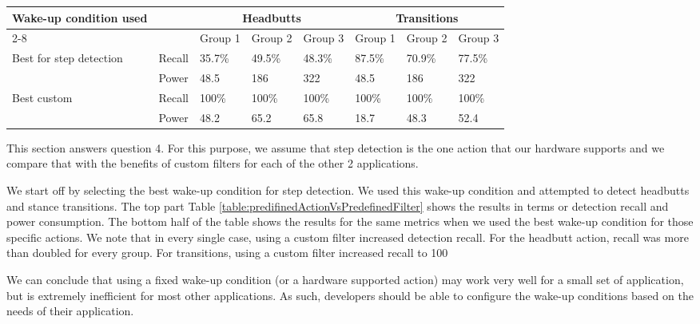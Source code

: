 \begin{table*}[t]
    \begin{tabular}{|l|l|l|l|l|l|l|l|}
    \hline
    \multirow{2}{*}{ Wake-up condition used}
							& \multirow{2}{*}{~} & \multicolumn{3}{c|}{Headbutts} & \multicolumn{3}{c|}{Transitions} \\ \cline{2-8}
							&       & Group 1 & Group 2   & Group 3 & Group 1 & Group 2     & Group 3 \\ \hline
    \multirow{2}{*}{Best for step detection}
							& Recall & 35.7\%  & 49.5\%    & 48.3\%  & 87.5\%  & 70.9\%      & 77.5\%  \\ \cline{2-8}
							& Power  & 48.5    & 186       & 322     & 48.5    & 186         & 322     \\ \hline
    \multirow{2}{*}{Best custom}
							& Recall & 100\%   & 100\%     & 100\%   & 100\%   & 100\%       & 100\%   \\ \cline{2-8}
							& Power  & 48.2    & 65.2      & 65.8    & 18.7    & 48.3        & 52.4    \\ \hline
    \end{tabular}
	\caption{Detection recall and power consumption for the Headbutts and Transitions action using fixed or custom wake-up conditions}
	\label{table:predifinedActionVsPredefinedFilter}
\end{table*}

This section answers question 4. For this purpose, we assume that step detection is the one action that our hardware supports and we compare that with the benefits of custom filters for each of the other 2 applications. 

We start off by selecting the best wake-up condition for step detection. We used this wake-up condition and attempted to detect headbutts and stance transitions. The top part Table \ref{table:predifinedActionVsPredefinedFilter} shows the results in terms or detection recall and power consumption. The bottom half of the table shows the results for the same metrics when we used the best wake-up condition for those specific actions. We note that in every single case, using a custom filter increased detection recall. For the headbutt action, recall was more than doubled for every group. For transitions, using a custom filter increased recall to 100%

We can conclude that using a fixed wake-up condition (or a hardware supported action) may work very well for a small set of application, but is extremely inefficient for most other applications. As such, developers should be able to configure the wake-up conditions based on the needs of their application. 

